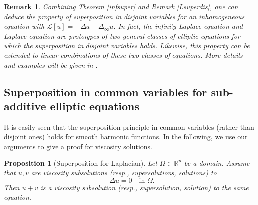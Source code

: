 \documentclass[12pt, reqno]{amsart}
\newtheorem{proposition}[theorem]{Proposition}
\newtheorem{remark}{Remark}%
\begin{document}
\begin{remark}
    Combining Theorem \ref{infsuper} and Remark \ref{Lsuperdis}, one can deduce the property of superposition in disjoint variables for an inhomogeneous equation with $\mathcal{L}[u]=-\Delta u-\Delta_\infty u$. In fact, the infinity Laplace equation and Laplace equation are prototypes of two general classes of elliptic equations for which the superposition in disjoint variables holds. Likewise, this property can be extended to linear combinations of these two classes of equations. More details and examples will be given in \cite{LMZ24}. 
\end{remark}

\subsection{Superposition in common variables for sub-additive elliptic equations} \label{convex} %


It is easily seen that the superposition principle in common variables (rather than disjoint ones) holds for smooth harmonic functions. In the following, we use our arguments to give a proof for viscosity solutions. 

 


\begin{proposition}[Superposition for Laplacian]\label{Lapsup}
    Let $\Omega\subset \mathbb{R}^n$ be a domain. Assume that $u, v$  are viscosity subsolutions (resp., supersolutions, solutions) to 
    \[
    -\Delta u=0 \quad \text{in $\Omega$}.
    \] Then $u+v$ is a viscosity subsolution (resp., supersolution, solution) to the same equation. 
\end{proposition}
\end{document}
